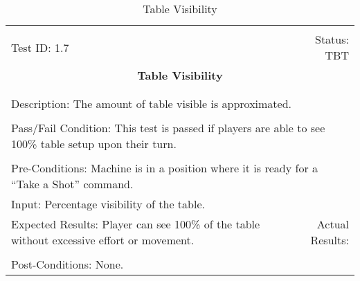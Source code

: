 \documentclass[titlepage]{article}
\begin{document}
\begin{center}%
\begin{table}
\begin{tabular}{|l r|}\hline&\\[-2mm]
	Test ID: 1.7	&Status: TBT\\[-3mm]
	\multicolumn{2}{|c|}{\textbf{\large{Table Visibility}}}\\&\\\hline&\\[-3mm]
	\multicolumn{2}{|p{\textwidth}|}{Description: The amount of table visible is approximated.}\\[1mm]\hline&\\[-3mm]
	\multicolumn{2}{|p{\textwidth}|}{Pass/Fail Condition: This test is passed if players are able to see 100\% table setup upon their turn.}\\[1mm]\hline&\\[-3mm]
	\multicolumn{2}{|p{\textwidth}|}{Pre-Conditions: Machine is in a position where it is ready for a ``Take a Shot'' command.}\\[4mm]
	\multicolumn{2}{|p{\textwidth}|}{Input: Percentage visibility of the table.}\\[2mm]\hline
	\multicolumn{1}{|p{0.49\textwidth}}{Expected Results: Player can see 100\% of the table without excessive effort or movement.}	&\multicolumn{1}{|p{0.45\textwidth}|}{Actual Results:}\\\hline&\\[-3mm]
	\multicolumn{2}{|p{\textwidth}|}{Post-Conditions: None.}\\\hline
\end{tabular}
\caption{Table Visibility}
\end{table}
\end{center}
\end{document}
